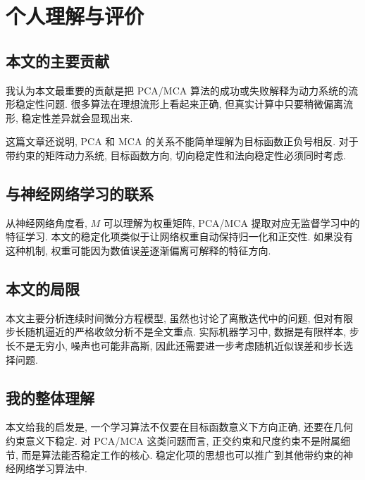 \documentclass[oneside]{ctexart}
\begin{document}
\section{个人理解与评价}

\subsection{本文的主要贡献}

我认为本文最重要的贡献是把 PCA/MCA 算法的成功或失败解释为动力系统的流形稳定性问题. 很多算法在理想流形上看起来正确, 但真实计算中只要稍微偏离流形, 稳定性差异就会显现出来.

这篇文章还说明, PCA 和 MCA 的关系不能简单理解为目标函数正负号相反. 对于带约束的矩阵动力系统, 目标函数方向, 切向稳定性和法向稳定性必须同时考虑.

\subsection{与神经网络学习的联系}

从神经网络角度看, $M$ 可以理解为权重矩阵, PCA/MCA 提取对应无监督学习中的特征学习. 本文的稳定化项类似于让网络权重自动保持归一化和正交性. 如果没有这种机制, 权重可能因为数值误差逐渐偏离可解释的特征方向.

\subsection{本文的局限}

本文主要分析连续时间微分方程模型, 虽然也讨论了离散迭代中的问题, 但对有限步长随机逼近的严格收敛分析不是全文重点. 实际机器学习中, 数据是有限样本, 步长不是无穷小, 噪声也可能非高斯, 因此还需要进一步考虑随机近似误差和步长选择问题.

\subsection{我的整体理解}

本文给我的启发是, 一个学习算法不仅要在目标函数意义下方向正确, 还要在几何约束意义下稳定. 对 PCA/MCA 这类问题而言, 正交约束和尺度约束不是附属细节, 而是算法能否稳定工作的核心. 稳定化项的思想也可以推广到其他带约束的神经网络学习算法中.
\end{document}
